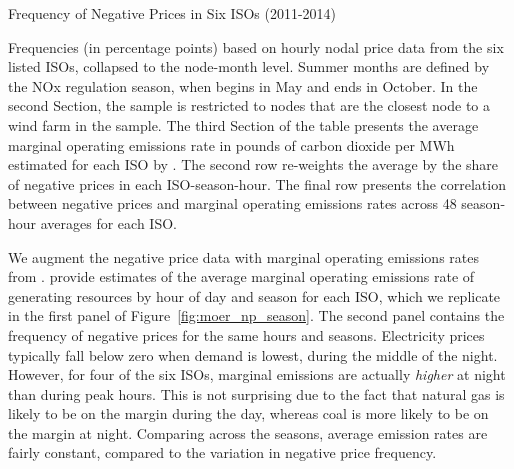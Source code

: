 \documentclass[12pt]{article}
\begin{document}
\begin{table}[h]
    \begin{centering}
    \caption{Frequency of Negative Prices in Six ISOs (2011-2014)\label{tab:Frequency-of-Negative}}
    \par\end{centering}
    \vspace{-15pt}
    
    
    
    \footnotesize
    
    Frequencies (in percentage points) based on hourly nodal price data from the six listed ISOs, collapsed to the node-month level. Summer months are defined by the NOx regulation season, when begins in May and ends in October. In the second Section, the sample is restricted to nodes that are the closest node to a wind farm in the sample. The third Section of the table presents the average marginal operating emissions rate in pounds of carbon dioxide per MWh estimated for each ISO by \citet{callaway_location_2018}. The second row re-weights the average by the share of negative prices in each ISO-season-hour. The final row presents the correlation between negative prices and marginal operating emissions rates across 48 season-hour averages for each ISO.
\end{table}

We augment the negative price data with marginal operating emissions rates from \citet{callaway_location_2018}. \citet{callaway_location_2018} provide estimates of the average marginal operating emissions rate of generating resources by hour of day and season for each ISO, which we replicate in the first panel of Figure~\ref{fig:moer_np_season}. The second panel contains the frequency of negative prices for the same hours and seasons. Electricity prices typically fall below zero when demand is lowest, during the middle of the night. However, for four of the six ISOs, marginal emissions are actually \emph{higher} at night than during peak hours. This is not surprising due to the fact that natural gas is likely to be on the margin during the day, whereas coal is more likely to be on the margin at night. Comparing across the seasons, average emission rates are fairly constant, compared to the variation in negative price frequency.

\end{document}
